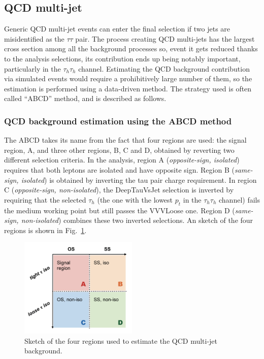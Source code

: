 \documentclass[../main.tex]{subfiles}
\begin{document}
\subsection{QCD multi-jet}
\label{hh:subsec:qcd}


Generic QCD multi-jet events can enter the final selection if two jets are misidentified as the $\tau\tau$ pair. The process creating QCD multi-jets has the largest cross section among all the background processes so, event it gets reduced thanks to the analysis selections, its contribution ends up being notably important, particularly in the $\tau_h\tau_h$ channel. Estimating the QCD background contribution via simulated events would require a prohibitively large number of them, so the estimation is performed using a data-driven method. The strategy used is often called ``ABCD'' method, and is described as follows.


\subsubsection{QCD background estimation using the ABCD method}

The ABCD takes its name from the fact that four regions are used: the signal region, A, and three other regions, B, C and D, obtained by reverting two different selection criteria. In the \hhbbtt{} analysis, region A (\textit{opposite-sign, isolated}) requires that both leptons are isolated and have opposite sign. Region B (\textit{same-sign, isolated}) is obtained by inverting the tau pair charge requirement. In region C (\textit{opposite-sign, non-isolated}), the DeepTauVsJet selection is inverted by requiring that the selected $\tau_h$ (the one with the lowest $p_t$ in the $\tau_h\tau_h$ channel) fails the medium working point but still passes the VVVLoose one. Region D (\textit{same-sign, non-isolated}) combines these two inverted selections. An sketch of the four regions is shown in Fig.~\ref{hh:fig:qcd_sketch}.

\begin{figure}[h!]
\begin{center}
\includegraphics[width=0.5\textwidth]{Images/QCDschema}
\end{center}
\caption[ABCD method for QCD background estimation]{Sketch of the four regions used to estimate the QCD multi-jet background.}
\label{hh:fig:qcd_sketch}
\end{figure}
\end{document}
